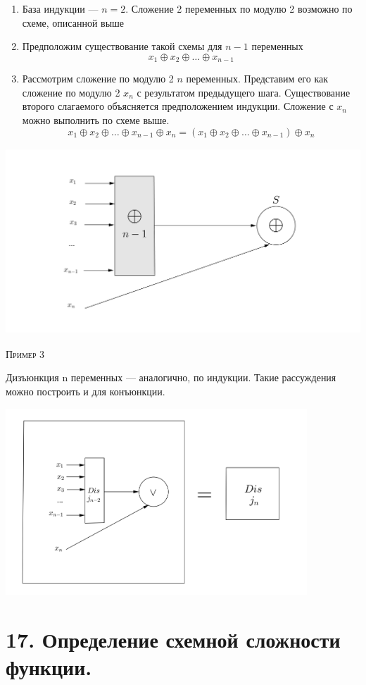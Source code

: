 \begin{enumerate}
	\item База индукции --- $n = 2$. Сложение 2 переменных по модулю 2 возможно по схеме, описанной выше
	\item Предположим существование такой схемы для $n - 1$ переменных 
	\[x_1 \oplus x_2 \oplus \ldots \oplus x_{n-1}\]
	\item Рассмотрим сложение по модулю 2 $n$ переменных. Представим его как сложение по модулю 2 $x_n$ с результатом предыдущего шага. Существование второго слагаемого объясняется предположением индукции. Сложение с $x_n$ можно выполнить по схеме выше. 
	\[x_1 \oplus x_2 \oplus \ldots \oplus x_{n-1} \oplus x_n = (x_1 \oplus x_2 \oplus \ldots \oplus x_{n-1}) \oplus x_n\]
\end{enumerate}
\includegraphics[height=7cm]{images/2.png}

\textsc{Пример 3}

Дизъюнкция n переменных --- аналогично, по индукции. Такие рассуждения можно построить и для конъюнкции.

\includegraphics[height=7cm]{images/3.png}

\section*{17. Определение схемной сложности функции.}

